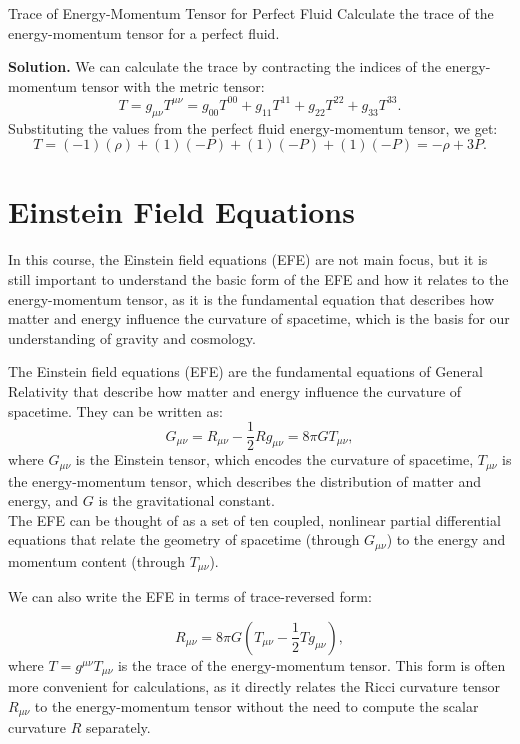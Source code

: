 \bigskip\noindent \bigskip\noindent
\begin{example}{Trace of Energy-Momentum Tensor for Perfect Fluid}{}
  Calculate the trace of the energy-momentum tensor for a perfect fluid.

  \bigskip\textbf{Solution.}\quad
  We can calculate the trace by contracting the indices of the energy-momentum tensor with the metric tensor:
  \[
    T = g_{\mu\nu} T^{\mu\nu} = g_{00} T^{00} + g_{11} T^{11} + g_{22} T^{22} + g_{33} T^{33}.
  \]
  Substituting the values from the perfect fluid energy-momentum tensor, we get:
  \[
    T = (-1)(\rho) + (1)(-P) + (1)(-P) + (1)(-P) = -\rho + 3P.
  \]
\end{example}

\newpage
\section{Einstein Field Equations}
In this course, the Einstein field equations (EFE) are not main focus, but it is still important to understand the basic form of the EFE and how it relates to the energy-momentum tensor, as it is the fundamental equation that describes how matter and energy influence the curvature of spacetime, which is the basis for our understanding of gravity and cosmology. 

\bigskip\noindent
\begin{theory}
  The Einstein field equations (EFE) are the fundamental equations of General Relativity that describe how matter and energy influence the curvature of spacetime. They can be written as:
  \[
    G_{\mu\nu} = R_{\mu\nu} - \frac{1}{2} R g_{\mu\nu} = 8\pi G T_{\mu\nu},
  \]
  where $G_{\mu\nu}$ is the Einstein tensor, which encodes the curvature of spacetime, $T_{\mu\nu}$ is the energy-momentum tensor, which describes the distribution of matter and energy, and $G$ is the gravitational constant. \\  

  The EFE can be thought of as a set of ten coupled, nonlinear partial differential equations that relate the geometry of spacetime (through $G_{\mu\nu}$) to the energy and momentum content (through $T_{\mu\nu}$). 
\end{theory}

\bigskip\noindent
We can also write the EFE in terms of trace-reversed form:
\begin{theory}
  \[
    R_{\mu\nu} = 8\pi G \left( T_{\mu\nu} - \frac{1}{2} T g_{\mu\nu} \right),
  \]
  where $T = g^{\mu\nu} T_{\mu\nu}$ is the trace of the energy-momentum tensor. This form is often more convenient for calculations, as it directly relates the Ricci curvature tensor $R_{\mu\nu}$ to the energy-momentum tensor without the need to compute the scalar curvature $R$ separately.
\end{theory}

